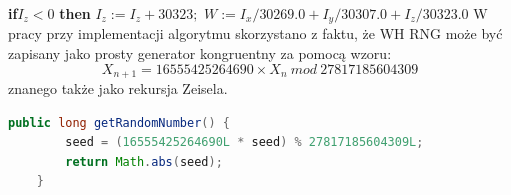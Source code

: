 \documentclass[a4paper, 11pt]{article} %
\begin{document}
\noindent \textbf{if}$I_z < 0$ \textbf{then}
\newline \indent	$I_z := I_z + 30323;$
\noindent \newline $W := I_x/30269.0 + I_y/30307.0 + I_z/30323.0$
\newline W pracy przy implementacji algorytmu skorzystano z faktu, że WH RNG może być zapisany jako prosty generator kongruentny za pomocą wzoru: 
$$X_{n+1} = 16555425264690 \times X_n\ mod\ 27817185604309 $$
znanego także jako rekursja Zeisela.

\begin{lstlisting}[style=mystyle, language=java, frame=single, caption = Generowanie następnej liczby pseudolosowej przez algorytm Wichmanna-Hilla na podstawie rekursji Zeisela.]
    public long getRandomNumber() {
        seed = (16555425264690L * seed) % 27817185604309L;
        return Math.abs(seed);
    }
\end{lstlisting}
\end{document}
